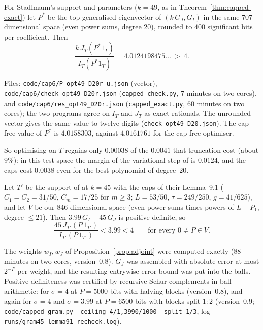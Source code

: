 \begin{proposition}\label{prop:opt49}
For Stadlmann's support and parameters ($k=49$, as in
Theorem~\ref{thm:capped-exact}) let $P^\ast$ be the top generalised
eigenvector of $(k\,G_J,G_I)$ in the same $707$-dimensional space (even
power sums, degree $20$), rounded to $400$ significant bits per
coefficient. Then
\[
\frac{k\,J_T(P^\ast1_T)}{I_T(P^\ast1_T)}=4.0124198475\ldots\ >\ 4 .
\]
\end{proposition}
\begin{sloppypar}
Files: \texttt{code/cap6/P\_opt49\_D20r\_u.json} (vector),
\texttt{code/cap6/check\_opt49\_D20r.json} (\texttt{capped\_check.py}, $7$
minutes on two cores), and \texttt{code/cap6/res\_opt49\_D20r.json} (\texttt{capped\_exact.py}, $60$ minutes on two cores); the two programs agree on $I_T$ and $J_T$ as exact rationals. The unrounded vector gives the same value to
twelve digits (\texttt{check\_opt49\_D20.json}). The cap-free value of
$P^\ast$ is $4.0158303$, against $4.0161761$ for the cap-free optimiser.
\end{sloppypar}
So optimising on $T$ regains only $0.00038$ of the $0.0041$ that truncation
cost (about $9\%$): in this test space the margin of the variational step of
\cite{Sta26} is $0.0124$, and the caps cost $0.0038$ even for the best
polynomial of degree~$20$.

\begin{proposition}\label{prop:cha-ceiling}
Let $T'$ be the support of \cite{Cha26} at $k=45$ with the caps of their
Lemma~9.1 ($C_1=C_2=31/50$, $C_m=17/25$ for $m\ge3$; $L=53/50$,
$\tau=249/250$, $g=41/625$), and let $V$ be our $846$-dimensional space
(even power sums times powers of $L-P_1$, degree $\le21$). Then
$3.99\,G_I-45\,G_J$ is positive definite, so
\[
\frac{45\,J_{T'}(P\,1_{T'})}{I_{T'}(P\,1_{T'})}<3.99<4\qquad\text{for every }0\ne P\in V .
\]
\end{proposition}
\begin{sloppypar}
The weights $w_I,w_J$ of Proposition~\ref{prop:adjoint} were computed exactly
($88$ minutes on two cores, version~0.8). $G_J$ was assembled with absolute
error at most $2^{-P}$ per weight, and the resulting entrywise error bound was
put into the balls. Positive definiteness was certified by recursive Schur
complements in ball arithmetic: for $\sigma=4$ at $P=5000$ bits with halving
blocks (version~0.8), and again for $\sigma=4$ and $\sigma=3.99$ at
$P=6500$ bits with blocks split $1:2$ (version~0.9;
\texttt{code/capped\_gram.py --ceiling 4/1,3990/1000 --split 1/3}, log
\texttt{runs/gram45\_lemma91\_recheck.log}).
\end{sloppypar}

